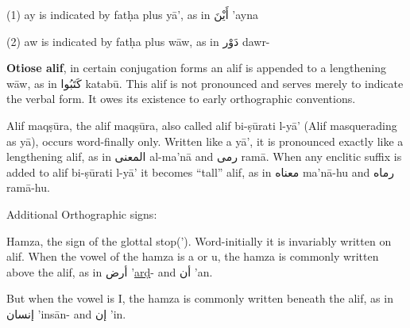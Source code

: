 \documentclass{article}
\newcommand{\ar}[1]{{\arabicfont #1}}
\begin{document}
\vspace{1em}

\begin{center}
(1) ay is indicated by fat\d{h}a plus y\={a}', as in \ar{أَيْنَ} 'ayna

\vspace{0.5em}

(2) aw is indicated by fat\d{h}a plus w\={a}w, as in \ar{دَوْر} dawr-
\end{center}


\vspace{1.5em}

\textbf{Otiose alif}, in certain conjugation forms an alif is appended to a lengthening w\={a}w, as in
\ar{كَتَبُوا} katab\={u}. This alif is not pronounced and serves merely to indicate the verbal form.
It owes its existence to early orthographic conventions.

\vspace{1.5em}

\begin{center}
Alif maq\d{s}\={u}ra, the alif maq\d{s}\={u}ra, also called alif bi-\d{s}\={u}rati l-y\={a}'
(Alif masquerading as y\={a}), occurs word-finally only. Written like a y\={a}', it is pronounced
exactly like a lengthening alif, as in \ar{المعنى} al-ma'n\={a} and \ar{رمى} ram\={a}. When any enclitic
suffix is added to alif bi-\d{s}\={u}rati l-y\={a}' it becomes ``tall'' alif, as in \ar{معناه} ma'n\={a}-hu and \ar{رماه}
ram\={a}-hu.
\end{center}

\vspace{1.5em}

\begin{center}
Additional Orthographic signs:
\end{center}

\vspace{0.8em}

Hamza, the sign of the glottal stop('). Word-initially it is invariably written on alif.
When the vowel of the hamza is a or u, the hamza is commonly written above the alif,
as in \ar{أرض} '\underline{ar\d{d}}- and \ar{أن} 'an.

\vspace{0.8em}

But when the vowel is I, the hamza is commonly written beneath the alif, as in \ar{إنسان}
'ins\={a}n- and \ar{إن} 'in.

\vspace{1em}
\end{document}
